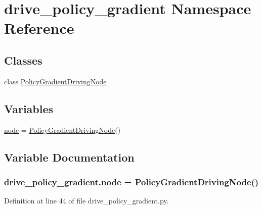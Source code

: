 \hypertarget{namespacedrive__policy__gradient}{}\section{drive\+\_\+policy\+\_\+gradient Namespace Reference}
\label{namespacedrive__policy__gradient}
\subsection*{Classes}
\begin{DoxyCompactItemize}
\item 
class \hyperlink{classdrive__policy__gradient_1_1_policy_gradient_driving_node}{Policy\+Gradient\+Driving\+Node}
\end{DoxyCompactItemize}
\subsection*{Variables}
\begin{DoxyCompactItemize}
\item 
\hyperlink{namespacedrive__policy__gradient_aab1d72bcfaa68ca3af0d4d62b4f42490}{node} = \hyperlink{classdrive__policy__gradient_1_1_policy_gradient_driving_node}{Policy\+Gradient\+Driving\+Node}()
\end{DoxyCompactItemize}


\subsection{Variable Documentation}
\subsubsection[{\texorpdfstring{node}{node}}]{\setlength{\rightskip}{0pt plus 5cm}drive\+\_\+policy\+\_\+gradient.\+node = {\bf Policy\+Gradient\+Driving\+Node}()}\hypertarget{namespacedrive__policy__gradient_aab1d72bcfaa68ca3af0d4d62b4f42490}{}\label{namespacedrive__policy__gradient_aab1d72bcfaa68ca3af0d4d62b4f42490}


Definition at line 44 of file drive\+\_\+policy\+\_\+gradient.\+py.

